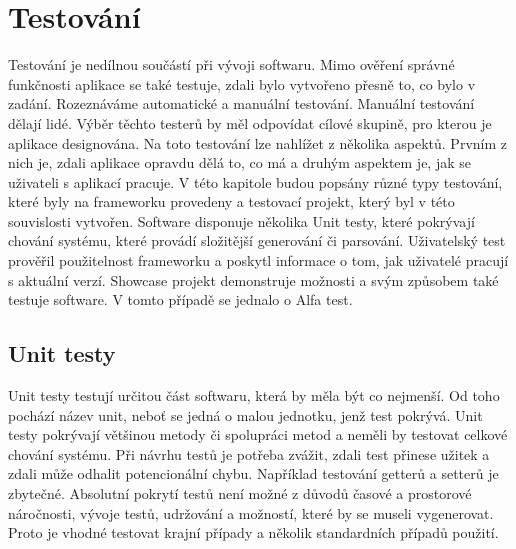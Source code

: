 \chapter{Testování}
Testování je nedílnou součástí při vývoji softwaru. Mimo ověření správné funkčnosti aplikace se také testuje, zdali bylo vytvořeno přesně to, co bylo v zadání. Rozeznáváme automatické a manuální testování. Manuální testování dělají lidé. Výběr těchto testerů by měl odpovídat cílové skupině, pro kterou je aplikace designována. Na toto testování lze nahlížet z několika aspektů. Prvním z nich je, zdali aplikace opravdu dělá to, co má a druhým aspektem je, jak se uživateli s aplikací pracuje. V této kapitole budou popsány různé typy testování, které byly na frameworku provedeny a testovací projekt, který byl v této souvislosti vytvořen. Software disponuje několika Unit testy, které pokrývají chování systému, které provádí složitější generování či parsování. Uživatelský test prověřil použitelnost frameworku a poskytl informace o tom, jak uživatelé pracují s aktuální verzí. Showcase projekt demonstruje možnosti a svým způsobem také testuje software. V tomto případě se jednalo o Alfa test.

\section{Unit testy}
Unit testy testují určitou část softwaru, která by měla být co nejmenší. Od toho pochází název unit, neboť se jedná o malou jednotku, jenž test pokrývá. Unit testy pokrývají většinou metody či spolupráci metod a neměli by testovat celkové chování systému. Při návrhu testů je potřeba zvážit, zdali test přinese užitek a zdali může odhalit potencionální chybu. Například testování getterů a setterů je zbytečné. Absolutní pokrytí testů není možné z důvodů časové a prostorové náročnosti, vývoje testů, udržování a možností, které by se museli vygenerovat. Proto je vhodné testovat krajní případy a několik standardních případů použití. 

